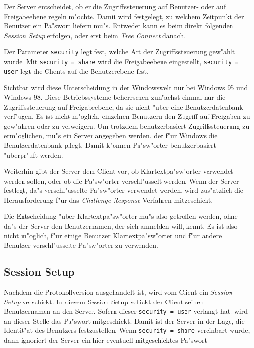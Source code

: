 \documentclass{scrartcl}
\newcommand{\param}{\texttt}
\newcommand{\defin}{\emph}
\begin{document}
Der Server entscheidet, ob er die Zugriffssteuerung auf Benutzer- oder
auf Freigabeebene regeln m"ochte. Damit wird festgelegt, zu welchem
Zeitpunkt der Benutzer ein Pa"swort liefern mu"s. Entweder kann es
beim direkt folgenden \defin{Session Setup} erfolgen, oder erst beim
\defin{Tree Connect} danach.

Der Parameter \param{security} legt fest, welche Art der
Zugriffssteuerung gew"ahlt wurde.  Mit \param{security = share} wird
die Freigabeebene eingestellt, \param{security = user} legt die
Clients auf die Benutzerebene fest.

Sichtbar wird diese Unterscheidung in der Windowswelt nur bei Windows
95 und Windows 98. Diese Betriebssysteme beherrschen zun"achst einmal
nur die Zugriffssteuerung auf Freigabeebene, da sie nicht "uber eine
Benutzerdatenbank verf"ugen.  Es ist nicht m"oglich, einzelnen
Benutzern den Zugriff auf Freigaben zu gew"ahren oder zu
verweigern. Um trotzdem benutzerbasiert Zugriffssteuerung zu
erm"oglichen, mu"s ein Server angegeben werden, der f"ur Windows die
Benutzerdatenbank pflegt. Damit k"onnen Pa"sw"orter benutzerbasiert
"uberpr"uft werden.

Weiterhin gibt der Server dem Client vor, ob Klartextpa"sw"orter
verwendet werden sollen, oder ob die Pa"sw"orter verschl"usselt
werden. Wenn der Server festlegt, da"s verschl"usselte Pa"sw"orter
verwendet werden, wird zus"atzlich die Herausforderung f"ur das
\defin{Challenge Response} Verfahren mitgeschickt.

Die Entscheidung "uber Klartextpa"sw"orter mu"s also getroffen werden,
ohne da"s der Server den Benutzernamen, der sich anmelden will,
kennt. Es ist also nicht m"oglich, f"ur einige Benutzer
Klartextpa"sw"orter und f"ur andere Benutzer verschl"usselte
Pa"sw"orter zu verwenden.

\subsection*{Session Setup}

Nachdem die Protokollversion ausgehandelt ist, wird vom Client ein
\defin{Session Setup} verschickt. In diesem Session Setup schickt der
Client seinen Benutzernamen an den Server. Sofern dieser
\param{security = user} verlangt hat, wird an dieser Stelle das
Pa"swort mitgeschickt. Damit ist der Server in der Lage, die
Identit"at des Benutzers festzustellen. Wenn \param{security = share}
vereinbart wurde, dann ignoriert der Server ein hier eventuell
mitgeschicktes Pa"swort.
\end{document}
